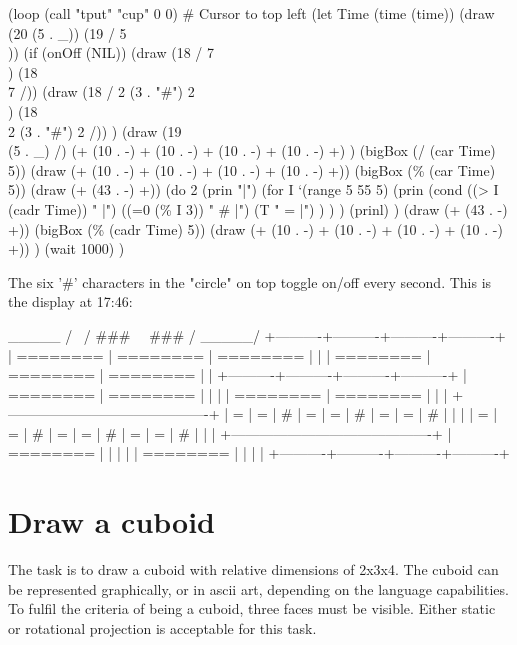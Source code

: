 \begin{wideverbatim}

(loop
   (call "tput" "cup" 0 0)  # Cursor to top left
   (let Time (time (time))
      (draw (20 (5 . _)) (19 / 5 \\))
      (if (onOff (NIL))
         (draw (18 / 7 \\) (18 \\ 7 /))
         (draw (18 / 2 (3 . "#") 2 \\) (18 \\ 2 (3 . "#") 2 /)) )
      (draw
         (19 \\ (5 . _) /)
         (+ (10 . -) + (10 . -) + (10 . -) + (10 . -) +) )
      (bigBox (/ (car Time) 5))
      (draw (+ (10 . -) + (10 . -) + (10 . -) + (10 . -) +))
      (bigBox (\% (car Time) 5))
      (draw (+ (43 . -) +))
      (do 2
         (prin "|")
         (for I `(range 5 55 5)
            (prin
               (cond
                  ((> I (cadr Time)) "   |")
                  ((=0 (\% I 3)) " # |")
                  (T " = |") ) ) )
         (prinl) )
      (draw (+ (43 . -) +))
      (bigBox (\% (cadr Time) 5))
      (draw (+ (10 . -) + (10 . -) + (10 . -) + (10 . -) +)) )
   (wait 1000) )

The six '#' characters in the "circle" on top toggle on/off every second. This
is the display at 17:46:

                    _____
                   /     \
                  /  ###  \
                  \  ###  /
                   \_____/
+----------+----------+----------+----------+
| ======== | ======== | ======== |          |
| ======== | ======== | ======== |          |
+----------+----------+----------+----------+
| ======== | ======== |          |          |
| ======== | ======== |          |          |
+-------------------------------------------+
| = | = | # | = | = | # | = | = | # |   |   |
| = | = | # | = | = | # | = | = | # |   |   |
+-------------------------------------------+
| ======== |          |          |          |
| ======== |          |          |          |
+----------+----------+----------+----------+

\end{wideverbatim}

\pagebreak{}
\section*{Draw a cuboid}

The task is to draw a cuboid with relative dimensions of 2x3x4. The
cuboid can be represented graphically, or in ascii art, depending on the
language capabilities. To fulfil the criteria of being a cuboid, three
faces must be visible. Either static or rotational projection is
acceptable for this task.


